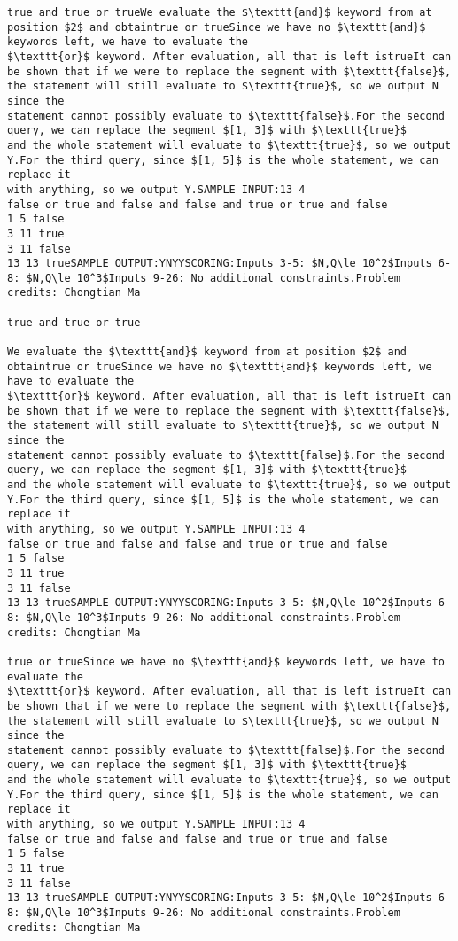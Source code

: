 \documentclass[12pt]{article}
\begin{document}
\begin{verbatim}
true and true or trueWe evaluate the $\texttt{and}$ keyword from at position $2$ and obtaintrue or trueSince we have no $\texttt{and}$ keywords left, we have to evaluate the
$\texttt{or}$ keyword. After evaluation, all that is left istrueIt can be shown that if we were to replace the segment with $\texttt{false}$,
the statement will still evaluate to $\texttt{true}$, so we output N since the
statement cannot possibly evaluate to $\texttt{false}$.For the second query, we can replace the segment $[1, 3]$ with $\texttt{true}$
and the whole statement will evaluate to $\texttt{true}$, so we output Y.For the third query, since $[1, 5]$ is the whole statement, we can replace it
with anything, so we output Y.SAMPLE INPUT:13 4
false or true and false and false and true or true and false
1 5 false
3 11 true
3 11 false
13 13 trueSAMPLE OUTPUT:YNYYSCORING:Inputs 3-5: $N,Q\le 10^2$Inputs 6-8: $N,Q\le 10^3$Inputs 9-26: No additional constraints.Problem credits: Chongtian Ma

true and true or true

We evaluate the $\texttt{and}$ keyword from at position $2$ and obtaintrue or trueSince we have no $\texttt{and}$ keywords left, we have to evaluate the
$\texttt{or}$ keyword. After evaluation, all that is left istrueIt can be shown that if we were to replace the segment with $\texttt{false}$,
the statement will still evaluate to $\texttt{true}$, so we output N since the
statement cannot possibly evaluate to $\texttt{false}$.For the second query, we can replace the segment $[1, 3]$ with $\texttt{true}$
and the whole statement will evaluate to $\texttt{true}$, so we output Y.For the third query, since $[1, 5]$ is the whole statement, we can replace it
with anything, so we output Y.SAMPLE INPUT:13 4
false or true and false and false and true or true and false
1 5 false
3 11 true
3 11 false
13 13 trueSAMPLE OUTPUT:YNYYSCORING:Inputs 3-5: $N,Q\le 10^2$Inputs 6-8: $N,Q\le 10^3$Inputs 9-26: No additional constraints.Problem credits: Chongtian Ma

true or trueSince we have no $\texttt{and}$ keywords left, we have to evaluate the
$\texttt{or}$ keyword. After evaluation, all that is left istrueIt can be shown that if we were to replace the segment with $\texttt{false}$,
the statement will still evaluate to $\texttt{true}$, so we output N since the
statement cannot possibly evaluate to $\texttt{false}$.For the second query, we can replace the segment $[1, 3]$ with $\texttt{true}$
and the whole statement will evaluate to $\texttt{true}$, so we output Y.For the third query, since $[1, 5]$ is the whole statement, we can replace it
with anything, so we output Y.SAMPLE INPUT:13 4
false or true and false and false and true or true and false
1 5 false
3 11 true
3 11 false
13 13 trueSAMPLE OUTPUT:YNYYSCORING:Inputs 3-5: $N,Q\le 10^2$Inputs 6-8: $N,Q\le 10^3$Inputs 9-26: No additional constraints.Problem credits: Chongtian Ma


\end{verbatim}
\end{document}
